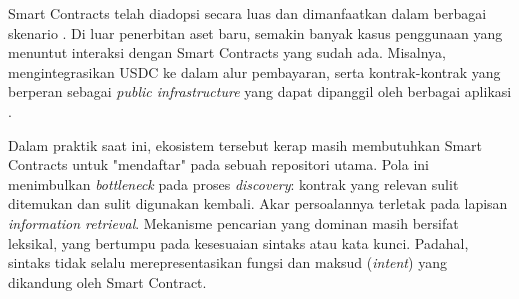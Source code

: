 



Smart Contracts telah diadopsi secara luas dan dimanfaatkan dalam berbagai skenario \parencite{alchemy_ethereum_statistics}. Di luar penerbitan aset baru, semakin banyak kasus penggunaan yang menuntut interaksi dengan Smart Contracts yang sudah ada. Misalnya, mengintegrasikan USDC ke dalam alur pembayaran, serta kontrak-kontrak yang berperan sebagai \textit{public infrastructure} yang dapat dipanggil oleh berbagai aplikasi \parencite{szabo1997formalizing}.

Dalam praktik saat ini, ekosistem tersebut kerap masih membutuhkan Smart Contracts untuk "mendaftar" pada sebuah repositori utama. Pola ini menimbulkan \textit{bottleneck} pada proses \textit{discovery}: kontrak yang relevan sulit ditemukan dan sulit digunakan kembali. Akar persoalannya terletak pada lapisan \textit{information retrieval}. Mekanisme pencarian yang dominan masih bersifat leksikal, yang bertumpu pada kesesuaian sintaks atau kata kunci. Padahal, sintaks tidak selalu merepresentasikan fungsi dan maksud (\textit{intent}) yang dikandung oleh Smart Contract.

